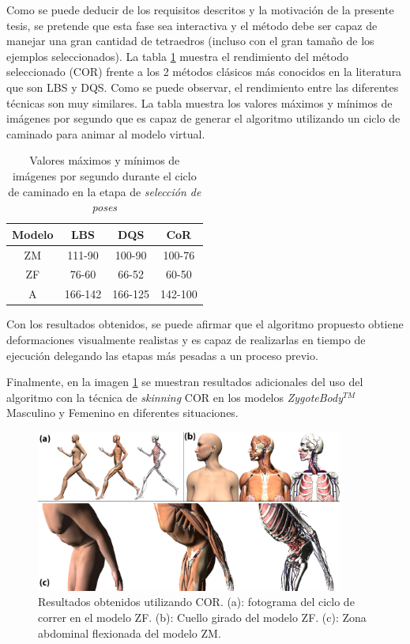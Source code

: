  Como se puede deducir de los requisitos descritos y la motivación de la presente tesis, se pretende que esta fase sea interactiva y el método debe ser capaz de manejar una gran cantidad de tetraedros (incluso con el gran tamaño de los ejemplos seleccionados). La tabla \ref{tab:inter} muestra el rendimiento  del método seleccionado (\ac{COR}) frente a los 2 métodos clásicos más conocidos en la literatura que son \ac{LBS} y \ac{DQS}. Como se puede observar, el rendimiento entre las diferentes técnicas son muy similares. La tabla muestra los valores máximos y mínimos de imágenes por segundo que es capaz de generar el algoritmo utilizando un ciclo de caminado para animar al modelo virtual.
%
\begin{table}[h]
\centering
\caption{Valores máximos y mínimos de imágenes por segundo durante el ciclo de caminado en la etapa de \emph{selección de poses} }
\begin{tabular}{cccc}
\textbf{Modelo}&\textbf{LBS} &\textbf{DQS} &\textbf{CoR} \\ 
\hline
ZM  & 111-90 & 100-90 & 100-76\\ 
\hline
ZF  & 76-60  & 66-52   & 60-50 \\ 
\hline
A   & 166-142 & 166-125 & 142-100\\ 
\hline
\end{tabular}
\label{tab:inter}
\end{table}


Con los resultados obtenidos, se puede afirmar que el algoritmo propuesto obtiene deformaciones visualmente realistas y es capaz de realizarlas en tiempo de ejecución delegando las etapas más pesadas a un proceso previo.

Finalmente, en la imagen \ref{fig:run1} se muestran resultados adicionales del uso del algoritmo con la técnica de \emph{skinning} \ac{COR} en los modelos \emph{ZygoteBody}$^{TM}$ Masculino y Femenino en diferentes situaciones.

\begin{figure}%
   \centering
   \includegraphics[width=0.90\textwidth]{IMG/examples}
    \caption{Resultados obtenidos utilizando \ac{COR}. (a): fotograma del ciclo de correr en el modelo ZF. (b): Cuello girado del modelo ZF. (c): Zona abdominal flexionada del modelo ZM.}
    \label{fig:run1}
\end{figure}

